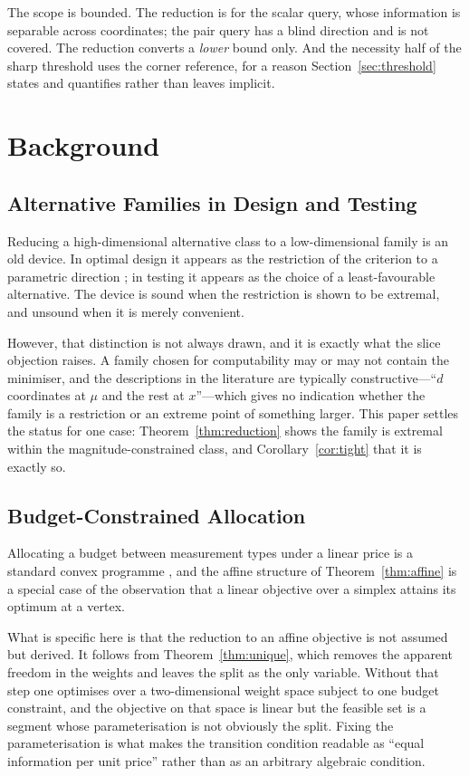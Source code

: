 The scope is bounded. The reduction is for the scalar query, whose information is separable
across coordinates; the pair query has a blind direction and is not covered. The reduction
converts a \emph{lower} bound only. And the necessity half of the sharp threshold uses the
corner reference, for a reason Section~\ref{sec:threshold} states and quantifies rather than
leaves implicit.

\section{Background}

\subsection{Alternative Families in Design and Testing}

Reducing a high-dimensional alternative class to a low-dimensional family is an old device.
In optimal design it appears as the restriction of the criterion to a parametric direction
\cite{pukelsheim2006,fedorov1972}; in testing it appears as the choice of a least-favourable
alternative. The device is sound when the restriction is shown to be extremal, and unsound
when it is merely convenient.

However, that distinction is not always drawn, and it is exactly what the slice objection
raises. A family chosen for computability may or may not contain the minimiser, and the
descriptions in the literature are typically constructive---``$d$ coordinates at $\mu$ and
the rest at $x$''---which gives no indication whether the family is a restriction or an
extreme point of something larger. This paper settles the status for one case:
Theorem~\ref{thm:reduction} shows the family is extremal within the magnitude-constrained
class, and Corollary~\ref{cor:tight} that it is exactly so.

\subsection{Budget-Constrained Allocation}

Allocating a budget between measurement types under a linear price is a standard convex
programme \cite{boyd2004}, and the affine structure of Theorem~\ref{thm:affine} is a special
case of the observation that a linear objective over a simplex attains its optimum at a
vertex.

What is specific here is that the reduction to an affine objective is not assumed but
derived. It follows from Theorem~\ref{thm:unique}, which removes the apparent freedom in the
weights and leaves the split as the only variable. Without that step one optimises over a
two-dimensional weight space subject to one budget constraint, and the objective on that
space is linear but the feasible set is a segment whose parameterisation is not obviously the
split. Fixing the parameterisation is what makes the transition condition readable as ``equal
information per unit price'' rather than as an arbitrary algebraic condition.

